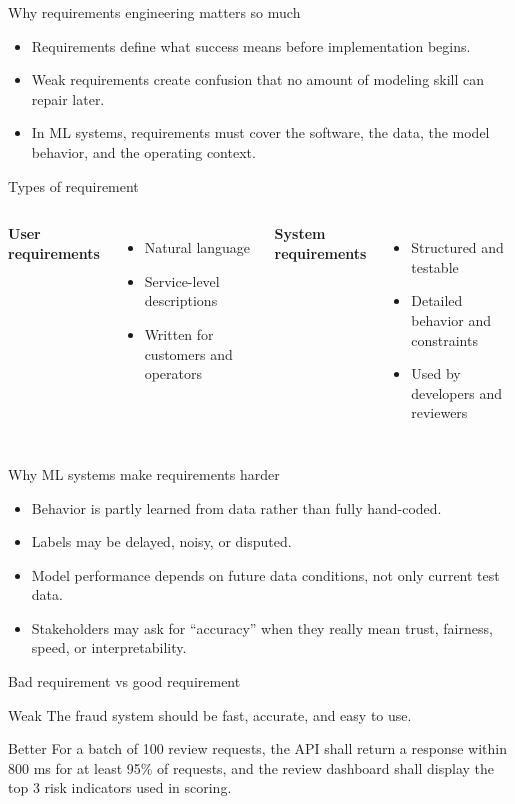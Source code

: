 \begin{frame}{Why requirements engineering matters so much}
\begin{itemize}
\item Requirements define what success means before implementation begins.
\item Weak requirements create confusion that no amount of modeling skill can repair later.
\item In ML systems, requirements must cover the software, the data, the model behavior, and the operating context.
\end{itemize}
\coursefooter
\end{frame}

\begin{frame}{Types of requirement}
\begin{columns}[T]
\textbf{User requirements}
\begin{itemize}
\item Natural language
\item Service-level descriptions
\item Written for customers and operators
\end{itemize}
\textbf{System requirements}
\begin{itemize}
\item Structured and testable
\item Detailed behavior and constraints
\item Used by developers and reviewers
\end{itemize}
\end{columns}
\coursefooter
\end{frame}

\begin{frame}{Why ML systems make requirements harder}
\begin{itemize}
\item Behavior is partly learned from data rather than fully hand-coded.
\item Labels may be delayed, noisy, or disputed.
\item Model performance depends on future data conditions, not only current test data.
\item Stakeholders may ask for ``accuracy'' when they really mean trust, fairness, speed, or interpretability.
\end{itemize}
\coursefooter
\end{frame}

\begin{frame}{Bad requirement vs good requirement}
\begin{block}{Weak}
The fraud system should be fast, accurate, and easy to use.
\end{block}
\begin{block}{Better}
For a batch of 100 review requests, the API shall return a response within 800 ms for at least 95\% of requests, and the review dashboard shall display the top 3 risk indicators used in scoring.
\end{block}
\coursefooter
\end{frame}

